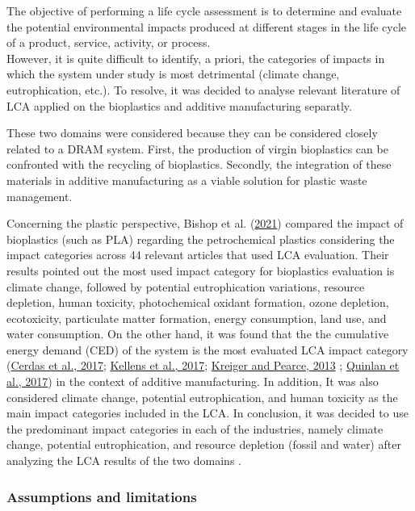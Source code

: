 \documentclass[12pt]{elsarticle} %
\begin{document}
The objective of performing a life cycle assessment is to determine and evaluate the potential environmental impacts produced at different stages in the life cycle of a product, service, activity, or process.\\
However, it is quite difficult to identify, a priori, the categories of impacts in which the system under study is most detrimental (climate change, eutrophication, etc.). To resolve, it was decided to analyse relevant literature of LCA applied on the bioplastics and additive manufacturing separatly.

These two domains were considered because they can be considered closely related to a DRAM system. First, the production of virgin bioplastics can be confronted with the recycling of bioplastics. Secondly, the integration of these materials in additive manufacturing as a viable solution for plastic waste management.

Concerning the plastic perspective, Bishop et al. (\protect\hyperlink{ref-Bishop2021}{2021}) compared the impact of bioplastics (such as PLA) regarding the petrochemical plastics considering the impact categories across 44 relevant articles that used LCA evaluation. Their results pointed out the most used impact category for bioplastics evaluation is climate change, followed by potential eutrophication variations, resource depletion, human toxicity, photochemical oxidant formation, ozone depletion, ecotoxicity, particulate matter formation, energy consumption, land use, and water consumption.
On the other hand, it was found that the the cumulative energy demand (CED) of the system is the most evaluated LCA impact category (\protect\hyperlink{ref-cerdas2017}{Cerdas et al., 2017}; \protect\hyperlink{ref-kellens2017}{Kellens et al., 2017}; \protect\hyperlink{ref-Kreiger2013}{Kreiger and Pearce, 2013} ; \protect\hyperlink{ref-quinlan2017}{Quinlan et al., 2017}) in the context of additive manufacturing. In addition, It was also considered climate change, potential eutrophication, and human toxicity as the main impact categories included in the LCA. In conclusion, it was decided to use the predominant impact categories in each of the industries, namely climate change, potential eutrophication, and resource depletion (fossil and water) after analyzing the LCA results of the two domains .

\hypertarget{assumptions-and-limitations}{%
\subsubsection{Assumptions and limitations}\label{assumptions-and-limitations}}
\end{document}
